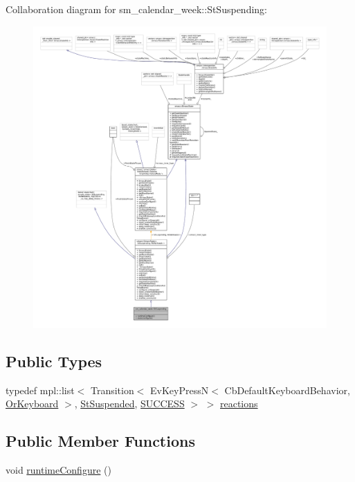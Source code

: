 Collaboration diagram for sm\+\_\+calendar\+\_\+week\+:\+:St\+Suspending\+:
\nopagebreak
\begin{figure}[H]
\begin{center}
\leavevmode
\includegraphics[width=350pt]{structsm__calendar__week_1_1StSuspending__coll__graph}
\end{center}
\end{figure}
\subsection*{Public Types}
\begin{DoxyCompactItemize}
\item 
typedef mpl\+::list$<$ Transition$<$ Ev\+Key\+PressN$<$ Cb\+Default\+Keyboard\+Behavior, \hyperlink{classsm__calendar__week_1_1OrKeyboard}{Or\+Keyboard} $>$, \hyperlink{structsm__calendar__week_1_1StSuspended}{St\+Suspended}, \hyperlink{classSUCCESS}{S\+U\+C\+C\+E\+SS} $>$ $>$ \hyperlink{structsm__calendar__week_1_1StSuspending_a56ffaa24fc432b233121231269f6b035}{reactions}
\end{DoxyCompactItemize}
\subsection*{Public Member Functions}
\begin{DoxyCompactItemize}
\item 
void \hyperlink{structsm__calendar__week_1_1StSuspending_acfdc1d72e745def99a6996444cfaa640}{runtime\+Configure} ()
\end{DoxyCompactItemize}
